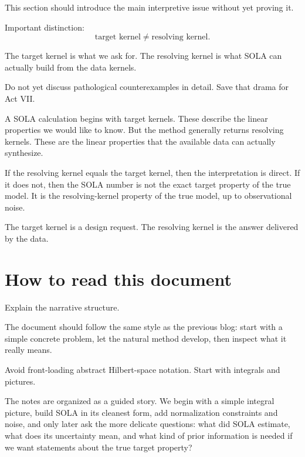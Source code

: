 \documentclass[11pt,openany]{book}
\theoremstyle{definition}
\theoremstyle{remark}
\begin{document}
\begin{developmentnote}
This section should introduce the main interpretive issue without yet proving it.

Important distinction:
\[
  \text{target kernel} \neq \text{resolving kernel}.
\]

The target kernel is what we ask for. The resolving kernel is what SOLA can actually build from
the data kernels.

Do not yet discuss pathological counterexamples in detail. Save that drama for Act VII.
\end{developmentnote}

A SOLA calculation begins with target kernels. These describe the linear properties we would
like to know. But the method generally returns resolving kernels. These are the linear
properties that the available data can actually synthesize.

If the resolving kernel equals the target kernel, then the interpretation is direct. If it does not,
then the SOLA number is not the exact target property of the true model. It is the resolving-kernel
property of the true model, up to observational noise.

\begin{warningbox}
The target kernel is a design request. The resolving kernel is the answer delivered by the data.
\end{warningbox}

\section*{How to read this document}

\begin{developmentnote}
Explain the narrative structure.

The document should follow the same style as the previous blog:
start with a simple concrete problem, let the natural method develop, then inspect what it really
means.

Avoid front-loading abstract Hilbert-space notation. Start with integrals and pictures.
\end{developmentnote}

The notes are organized as a guided story. We begin with a simple integral picture, build SOLA
in its cleanest form, add normalization constraints and noise, and only later ask the more delicate
questions: what did SOLA estimate, what does its uncertainty mean, and what kind of prior
information is needed if we want statements about the true target property?
\end{document}
